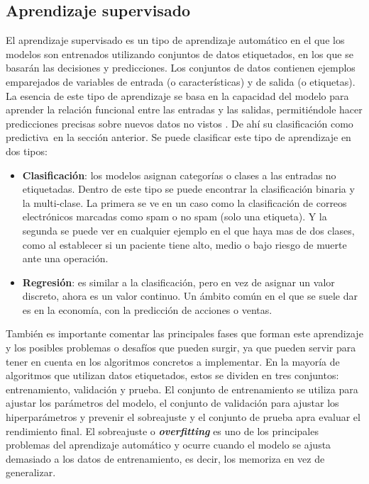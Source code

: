 \subsection{Aprendizaje supervisado}
El aprendizaje supervisado es un tipo de aprendizaje automático en el que los modelos son entrenados utilizando conjuntos de datos etiquetados, en los que se basarán las decisiones y predicciones. Los conjuntos de datos contienen ejemplos emparejados de variables de entrada (o características) y de salida (o etiquetas). La esencia de este tipo de aprendizaje se basa en la capacidad del modelo para aprender la relación funcional entre las entradas y las salidas, permitiéndole hacer predicciones precisas sobre nuevos datos no vistos \cite{SL:guide}. De ahí su clasificación como \guillemetleft predictiva\guillemetright ~en la sección anterior.
Se puede clasificar este tipo de aprendizaje en dos tipos:
\begin{itemize}
	\item \textbf{Clasificación}: los modelos asignan categorías o clases a las entradas no etiquetadas. Dentro de este tipo se puede encontrar la clasificación binaria y la multi-clase. La primera se ve en un caso como la clasificación de correos electrónicos marcadas como spam o no spam (solo una etiqueta). Y la segunda se puede ver en cualquier ejemplo en el que haya mas de dos clases, como al establecer si un paciente tiene alto, medio o bajo riesgo de muerte ante una operación.
	\item \textbf{Regresión}: es similar a la clasificación, pero en vez de asignar un valor discreto, ahora es un valor continuo. Un ámbito común en el que se suele dar es en la economía, con la predicción de acciones o ventas.
\end{itemize}

También es importante comentar las principales fases que forman este aprendizaje y los posibles problemas o desafíos que pueden surgir, ya que pueden servir para tener en cuenta en los algoritmos concretos a implementar.
En la mayoría de algoritmos que utilizan datos etiquetados, estos se dividen en tres conjuntos: entrenamiento, validación y prueba. El conjunto de entrenamiento se utiliza para ajustar los parámetros del modelo, el conjunto de validación para ajustar los hiperparámetros y prevenir el sobreajuste y el conjunto de prueba apra evaluar el rendimiento final.
El sobreajuste o \textit{\textbf{overfitting}} es uno de los principales problemas del aprendizaje automático y ocurre cuando el modelo se ajusta demasiado a los datos de entrenamiento, es decir, los memoriza en vez de generalizar.

